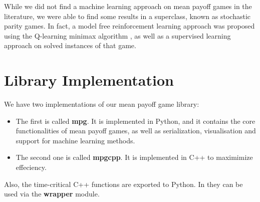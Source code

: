 While we did not find a machine learning approach on mean payoff games in the literature, we were able to find some results in a superclass, known as stochastic parity games. In fact, a model free reinforcement learning approach was proposed using the Q-learning minimax algorithm , as well as a supervised learning approach on solved instances of that game.

\section{Library Implementation}
We have two implementations of our mean payoff game library:
\begin{itemize}
	\item The first is called \textbf{mpg}. It is implemented in Python, and it contains the core functionalities of mean payoff games, as well as serialization, visualisation and support for machine learning methods.
	\item The second one is called \textbf{mpgcpp}. It is implemented in C++ to maximimize effeciency.
\end{itemize}
Also, the time-critical C++ functions are exported to Python. In they can be used via the \textbf{wrapper} module.

